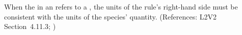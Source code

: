 When the  in an \AssignmentRule refers to a \Species, the
units of the rule's right-hand side must be consistent with the units of
the species' quantity.  (References: L2V2 Section~4.11.3;
)
